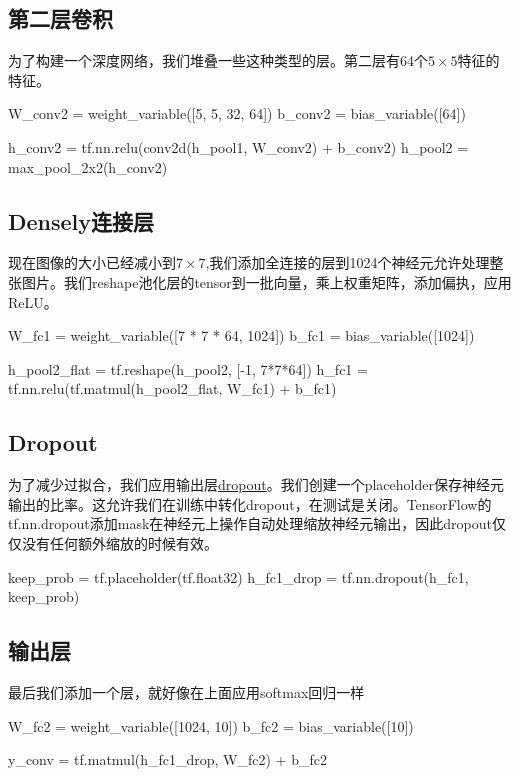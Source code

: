 \subsection{第二层卷积}
为了构建一个深度网络，我们堆叠一些这种类型的层。第二层有64个$5\times5$特征的特征。
\begin{pythoncode}
W_conv2 = weight_variable([5, 5, 32, 64])
b_conv2 = bias_variable([64])

h_conv2 = tf.nn.relu(conv2d(h_pool1, W_conv2) + b_conv2)
h_pool2 = max_pool_2x2(h_conv2)
\end{pythoncode}
\subsection{Densely连接层}
现在图像的大小已经减小到$7\times7$,我们添加全连接的层到1024个神经元允许处理整张图片。我们reshape池化层的tensor到一批向量，乘上权重矩阵，添加偏执，应用ReLU。
\begin{pythoncode}
W_fc1 = weight_variable([7 * 7 * 64, 1024])
b_fc1 = bias_variable([1024])

h_pool2_flat = tf.reshape(h_pool2, [-1, 7*7*64])
h_fc1 = tf.nn.relu(tf.matmul(h_pool2_flat, W_fc1) + b_fc1)
\end{pythoncode}
\subsection{Dropout}
为了减少过拟合，我们应用输出层\href{https://www.cs.toronto.edu/~hinton/absps/JMLRdropout.pdf}{dropout}。我们创建一个placeholder保存神经元输出的比率。这允许我们在训练中转化dropout，在测试是关闭。TensorFlow的tf.nn.dropout添加mask在神经元上操作自动处理缩放神经元输出，因此dropout仅仅没有任何额外缩放的时候有效。
\begin{pythoncode}
keep_prob = tf.placeholder(tf.float32)
h_fc1_drop = tf.nn.dropout(h_fc1, keep_prob)
\end{pythoncode}
\subsection{输出层}
最后我们添加一个层，就好像在上面应用softmax回归一样
\begin{pythoncode}
W_fc2 = weight_variable([1024, 10])
b_fc2 = bias_variable([10])

y_conv = tf.matmul(h_fc1_drop, W_fc2) + b_fc2
\end{pythoncode}
